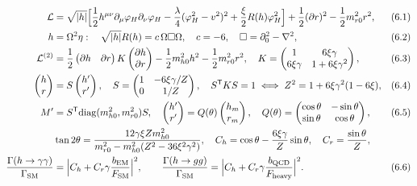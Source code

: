 \documentclass[10pt,a4paper]{article}
\begin{document}
\begin{align*}
\mathcal L&=\sqrt{|h|}\Big[\frac12h^{\mu\nu}\partial_\mu\varphi_H\partial_\nu\varphi_H-\frac\lambda4(\varphi_H^2-v^2)^2+\frac\xi2R(h)\varphi_H^2\Big]+\frac12(\partial r)^2-\frac12m_{r0}^2r^2,&&(6.1) \\
h&=\Omega^2\eta:\quad \sqrt{|h|}R(h)=c\,\Omega\Box\Omega,\quad c=-6,\quad \Box=\partial_0^2-\nabla^2,&&(6.2) \\
\mathcal L^{(2)}&=\frac12\begin{pmatrix}\partial h&\partial r\end{pmatrix}K\begin{pmatrix}\partial h\\ \partial r\end{pmatrix}-\frac12m_{h0}^2h^2-\frac12m_{r0}^2r^2,\quad K=\begin{pmatrix}1&6\xi\gamma\\ 6\xi\gamma&1+6\xi\gamma^2\end{pmatrix},&&(6.3) \\
\begin{pmatrix}h\\ r\end{pmatrix}&=S\begin{pmatrix}h'\\ r'\end{pmatrix},\quad S=\begin{pmatrix}1&-6\xi\gamma/Z\\ 0&1/Z\end{pmatrix},\quad S^{\mathsf T}KS=1\iff Z^2=1+6\xi\gamma^2(1-6\xi),&&(6.4) \\
M'&=S^{\mathsf T}\mathrm{diag}(m_{h0}^2,m_{r0}^2)S,\quad \begin{pmatrix}h'\\ r'\end{pmatrix}=Q(\theta)\begin{pmatrix}h_m\\ r_m\end{pmatrix},\quad Q(\theta)=\begin{pmatrix}\cos\theta&-\sin\theta\\ \sin\theta&\cos\theta\end{pmatrix},&&(6.5) \\
&\tan2\theta=\frac{12\gamma\xi Zm_{h0}^2}{m_{r0}^2-m_{h0}^2(Z^2-36\xi^2\gamma^2)},\quad C_h=\cos\theta-\frac{6\xi\gamma}Z\sin\theta,\quad C_r=\frac{\sin\theta}Z, \\
\frac{\Gamma(h\to\gamma\gamma)}{\Gamma_{\rm SM}}&=\Big|C_h+C_r\gamma\frac{b_{\rm EM}}{F_{\rm SM}}\Big|^2,\qquad \frac{\Gamma(h\to gg)}{\Gamma_{\rm SM}}=\Big|C_h+C_r\gamma\frac{b_{\rm QCD}}{F_{\rm heavy}}\Big|^2.&&(6.6)
\end{align*}
\end{document}
